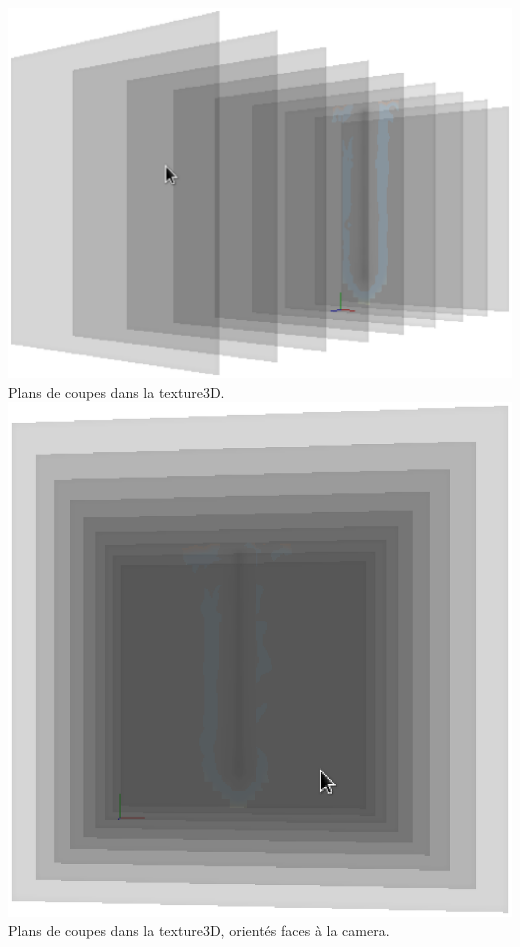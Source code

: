 \documentclass[a4paper,10pt]{article}
\begin{document}
    \begin{center}
	\includegraphics[scale=0.5]{Render3D.ps}\\
	Plans de coupes dans la texture3D.\\
	
	\includegraphics[scale=0.5]{Render3D2.ps}\\
	Plans de coupes dans la texture3D, orientés faces à la camera.\\
	

\end{center}
\end{document}

